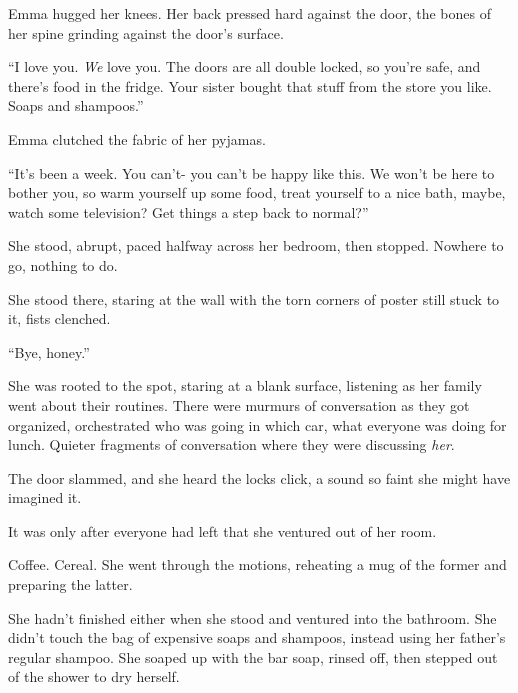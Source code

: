 Emma hugged her knees.  Her back pressed hard against the door, the bones of her spine grinding against the door's surface.



``I love you.  \emph{We} love you.  The doors are all double locked, so you're safe, and there's food in the fridge.  Your sister bought that stuff from the store you like.  Soaps and shampoos.''



Emma clutched the fabric of her pyjamas.



``It's been a week.  You can't- you can't be happy like this.  We won't be here to bother you, so warm yourself up some food, treat yourself to a nice bath, maybe, watch some television?  Get things a step back to normal?''



She stood, abrupt, paced halfway across her bedroom, then stopped.  Nowhere to go, nothing to do.



She stood there, staring at the wall with the torn corners of poster still stuck to it, fists clenched.



``Bye, honey.''



She was rooted to the spot, staring at a blank surface, listening as her family went about their routines.  There were murmurs of conversation as they got organized, orchestrated who was going in which car, what everyone was doing for lunch.  Quieter fragments of conversation where they were discussing \emph{her}.



The door slammed, and she heard the locks click, a sound so faint she might have imagined it.



It was only after everyone had left that she ventured out of her room.



Coffee.  Cereal.  She went through the motions, reheating a mug of the former and preparing the latter.



She hadn't finished either when she stood and ventured into the bathroom.  She didn't touch the bag of expensive soaps and shampoos, instead using her father's regular shampoo.  She soaped up with the bar soap, rinsed off, then stepped out of the shower to dry herself.




